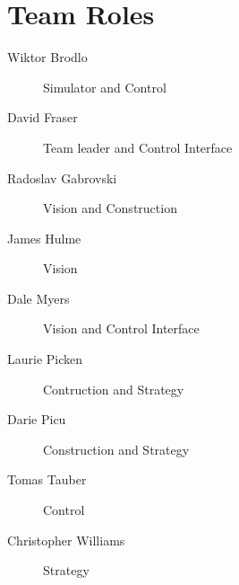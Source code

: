 \section{Team Roles}
\label{apx:roles}

\begin{description}
  \item[Wiktor Brodlo] Simulator and Control
  \item[David Fraser] Team leader and Control Interface
  \item[Radoslav Gabrovski] Vision and Construction
  \item[James Hulme] Vision
  \item[Dale Myers] Vision and Control Interface
  \item[Laurie Picken] Contruction and Strategy
  \item[Darie Picu] Construction and Strategy
  \item[Tomas Tauber] Control
  \item[Christopher Williams] Strategy
\end{description}
